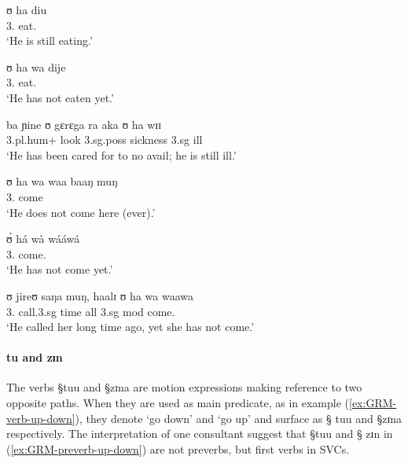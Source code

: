 \begin{exe}
\ex
\begin{xlist}
 

\ex\label{ex:vp32.24}
\gll ʊ ha diu \\
     {3.\sg}  {\mod} eat.\foc  \\
\glt  `He is still eating.' 


\ex\label{ex:vp20.3.2.}
\gll ʊ ha wa dije \\
 {3.\sg}  {\mod} {\neg} eat.{\pfv}   \\
\glt  `He has not eaten yet.'


\ex\label{ex:vp21.2.1.}
\gll ba ɲine ʊ gɛrɛga ra aka ʊ ha wɪɪ \\
 {\sc 3.pl.hum+} look {\sc 3.sg.poss} sickness {\foc} {\conn}  {\sc 3.sg}
{\mod} ill \\
\glt  `He has been cared for to no avail; he is still ill.' 


\ex\label{ex:vp20.1.1.}
\gll ʊ ha wa waa baaŋ muŋ \\
       {3.\sg} {\mod}  {\neg} come {\dem} {\quant}\\
\glt  `He does not come here (ever).' 


\ex\label{ex:vp20.3.1.}
\gll ʊ̀ há wà wááwá \\
       {3.\sg} {\mod}   {\neg} come.{\pfv} \\
\glt  `He has not come yet.' 


\ex\label{ex:yet-conn}
\gll ʊ jireʊ saŋa muŋ, haalɪ ʊ ha wa waawa \\
       {3.\sg}  call.{\sc 3.sg} time all {\conn}   {\sc 3.sg} {\sc mod}  {\neg}
come.{\pfv} \\
\glt  `He called her long time ago, yet she has not
come.' 
\end{xlist}
\end{exe}



\paragraph{tu and zɪn}
\label{sec:GRM-preverb-up-down} 

The verbs {\S tuu} and {\S zɪna} are motion
expressions making reference to two opposite paths. When they are used as main
predicate, as in example (\ref{ex:GRM-verb-up-down}),  they denote `go down' and
`go up' and  surface as {\S
tuu} and {\S zɪna} respectively.  The interpretation of one  consultant suggest
that  {\S tuu} and {\S
zɪn} in 
(\ref{ex:GRM-preverb-up-down}) are not preverbs, but first verbs in SVCs.

